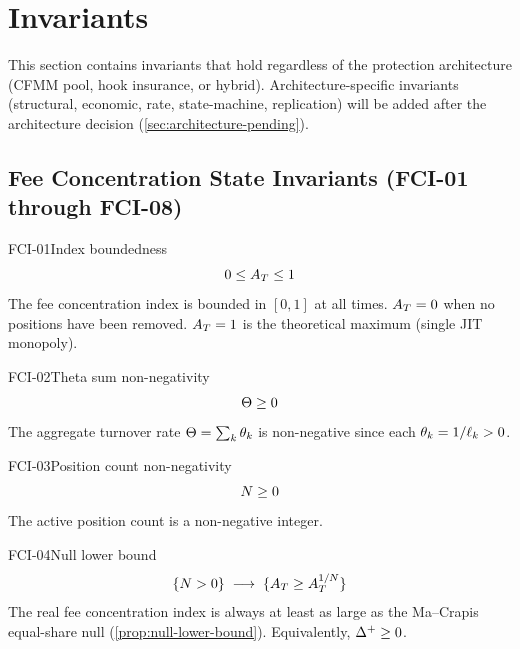 
\section{Invariants}\label{sec:invariants}

This section contains invariants that hold regardless of the protection architecture
(CFMM pool, hook insurance, or hybrid). Architecture-specific invariants
(structural, economic, rate, state-machine, replication) will be added after
the architecture decision (\cref{sec:architecture-pending}).

\subsection{Fee Concentration State Invariants (FCI-01 through FCI-08)}

\begin{invariant}{FCI-01}{Index boundedness}
\[
  0 \leq A_T \leq 1
\]
The fee concentration index is bounded in $[0,1]$ at all times.
$A_T = 0$ when no positions have been removed. $A_T = 1$ is the theoretical
maximum (single JIT monopoly).
\end{invariant}

\begin{invariant}{FCI-02}{Theta sum non-negativity}
\[
  \Theta \geq 0
\]
The aggregate turnover rate $\Theta = \sum_k \theta_k$ is non-negative
since each $\theta_k = 1/\ell_k > 0$.
\end{invariant}

\begin{invariant}{FCI-03}{Position count non-negativity}
\[
  N \geq 0
\]
The active position count is a non-negative integer.
\end{invariant}

\begin{invariant}{FCI-04}{Null lower bound}
\[
  \{N > 0\} \;\longrightarrow\; \{A_T \geq A_T^{1/N}\}
\]
The real fee concentration index is always at least as large as the Ma--Crapis
equal-share null (\cref{prop:null-lower-bound}). Equivalently, $\Delta^{+} \geq 0$.
\end{invariant}

